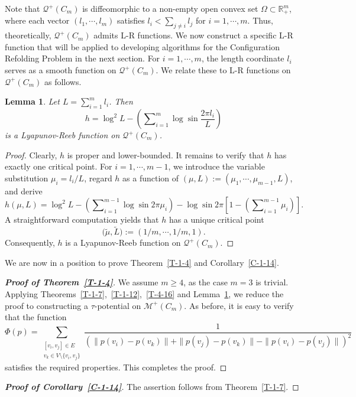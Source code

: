 \documentclass[11pt,letterpaper]{amsart}
\theoremstyle{plain}
\newtheorem{lemma}[theorem]{Lemma}
\theoremstyle{definition}
\theoremstyle{remark}
\numberwithin{equation}{section}
\begin{document}
Note that $\mathcal Q^{+}(C_m)$ is diffeomorphic to a non-empty open convex set $\Omega\subset\mathbb R_{+}^m$,  where each vector $(l_1,\cdots,l_m)$ satisfies
$l_i<\sum\nolimits_{j\neq i} l_j$ for $i=1,\cdots,m$. Thus, theoretically,
$\mathcal Q^{+}(C_m)$ admits L-R functions. We now construct a specific L-R function that will be applied to developing algorithms for the Configuration Refolding Problem in the next section. For $i=1,\cdots,m$, the length coordinate $l_i$ serves as a smooth function on $\mathcal Q^{+}(C_m)$. We relate these to L-R functions on
$\mathcal Q^{+}(C_m)$ as follows.

\begin{lemma}\label{L-4-17}
Let $L=\sum_{i=1}^m l_i$. Then
\[
h=\log^2 L-\left(\sum\nolimits_{i=1}^{m}\log\sin\dfrac{2\pi l_i}{L}\right)
\]
is a Lyapunov-Reeb function on $\mathcal Q^{+}(C_m)$.
\end{lemma}
\begin{proof}
Clearly, $h$ is proper and lower-bounded. It remains to verify that $h$ has exactly one critical point. For $i=1,\cdots,m-1$, we introduce the variable substitution $\mu_i=l_i/L$, regard $h$ as a function of $(\mu,L):=(\mu_1,\cdots,\mu_{m-1},L)$, and derive
\[
h(\mu,L)=\log^2 L-\left(\sum\nolimits_{i=1}^{m-1}\log\sin2\pi\mu_i\right)
-\log\sin2\pi\left[1-\left(\sum\nolimits_{i=1}^{m-1}\mu_i\right)\right].
\]
A straightforward computation yields that $h$ has a unique critical point
\[
\big(\tilde{\mu},\tilde{L}\big):=\left(1/m,\cdots,1/m,1\right).
\]
Consequently, $h$ is a Lyapunov-Reeb function on $\mathcal Q^{+}(C_m)$.
\end{proof}

We are now in a position to prove Theorem~\ref{T-1-4} and Corollary~\ref{C-1-14}.

\begin{proof}[\textbf{Proof of Theorem~\ref{T-1-4}}]
We assume $m\geq 4$, as the case $m=3$ is trivial. Applying Theorems~\ref{T-1-7},~\ref{T-1-12},~\ref{T-4-16} and Lemma~\ref{L-4-17}, we reduce the proof to constructing a $\tau$-potential on $\mathcal M^{+}(C_m)$. As before, it is easy to verify that the function
\[
\Phi(p)=\sum_{\substack{[v_i,v_j]\in E \\ v_k\in V\setminus\{v_i,v_j\}}}\frac{1}{\left(\|p(v_i)-p(v_k)\|+\|p(v_j)-p(v_k)\|-\|p(v_i)-p(v_j)\|\right)^2}
\]
satisfies the required properties. This completes the proof.
\end{proof}

\begin{proof}[\textbf{Proof of Corollary~\ref{C-1-14}}]
The assertion follows from Theorem~\ref{T-1-7}.
\end{proof}
\end{document}
